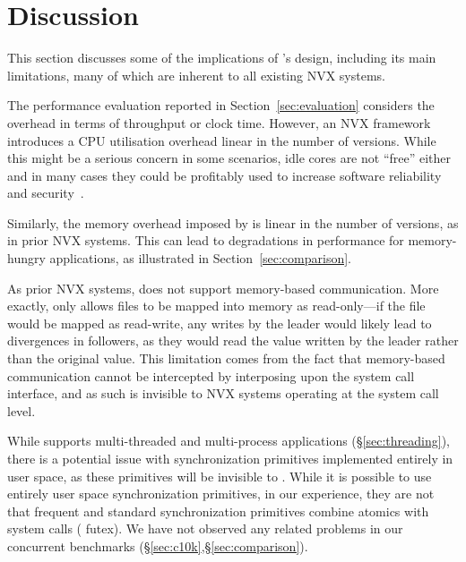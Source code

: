 \section{Discussion}
\label{sec:discussion}

This section discusses some of the implications of \varan's design,
including its main limitations, many of which are inherent to all
existing NVX systems.

 The performance
evaluation reported in Section~\ref{sec:evaluation} considers the
overhead in terms of throughput or clock time.  However, an NVX
framework introduces a CPU utilisation overhead linear in the number
of versions.  While this might be a serious concern in some scenarios,
idle cores are not ``free'' either~\cite{barroso2007} and in many
cases they could be profitably used to increase software reliability
and security~\cite{cox2006,multiplicity,orchestra09,diehard06}.


Similarly, the memory overhead imposed by \varan is linear in the
number of versions, as in prior NVX systems.  This can lead to
degradations in performance for memory-hungry applications, as
illustrated in Section~\ref{sec:comparison}.


 As prior NVX
systems, %
\varan does not support memory-based communication.  More exactly,
\varan only allows files to be mapped into memory as read-only---if
the file would be mapped as read-write, any writes by the leader would
likely lead to divergences in followers, as they would read the value
written by the leader rather than the original value.  This limitation
comes from the fact that memory-based communication cannot be
intercepted by interposing upon the system call interface, and as such
is invisible to NVX systems operating at the system call level.


 While \varan supports multi-threaded and
multi-process applications (\S\ref{sec:threading}), there is a
potential issue with synchronization primitives implemented entirely
in user space, as these primitives will be invisible to \varan. While
it is possible to use entirely user space synchronization primitives,
in our experience, they are not that frequent and standard
synchronization primitives combine atomics with system calls (\ie
futex). We have not observed any related problems in our concurrent
benchmarks (\S\ref{sec:c10k},\S\ref{sec:comparison}).

